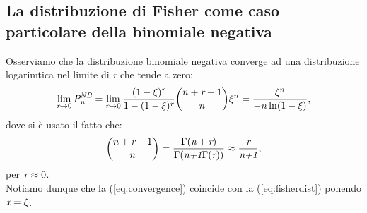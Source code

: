 \subsection{La distribuzione di Fisher come caso particolare della binomiale negativa}
Osserviamo che la distribuzione binomiale negativa converge ad una distribuzione logarimtica nel limite di \emph{r} che tende a zero:
\begin{equation}
    \lim_{\emph{r} \to 0}\emph{P}_\emph{n}^{\emph{NB}}= \lim_{\emph{r}\to0}\frac{(1-\xi)^{\emph{r}}}{1-(1-\xi)^{\emph{r}}}\binom{n+\emph{r}-1}{n}\xi^n=\frac{\xi^n}{-n\ln(1-\xi)},
\label{eq:convergence}
\end{equation}
dove si è usato il fatto che:
$$
\binom{n+\emph{r}-1}{n}=\frac{\Gamma(\emph{n}+\emph{r})}{\Gamma(\emph{n+1}\Gamma(\emph{r}))} \approx\frac{\emph{r}}{\emph{n+1}},
$$
per $\emph{r}\approx 0$.\\
Notiamo dunque che la (\ref{eq:convergence}) coincide con la (\ref{eq:fisherdist}) ponendo  $\emph{x}=\xi$.



